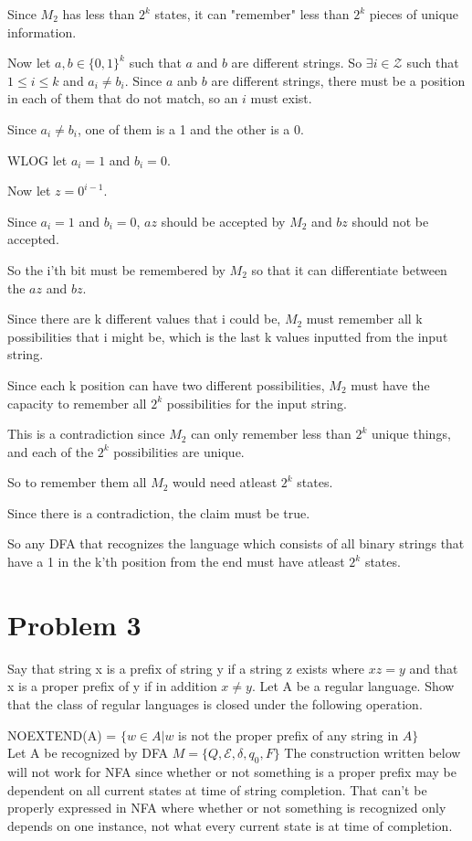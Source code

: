\documentclass[letterpaper, 11pt]{article}
\begin{document}
Since $M_2$ has less than $2^k$ states, it can "remember" less than $2^k$ pieces of unique information.

Now let $a,b \in \{0, 1\}^k$ such that $a$ and $b$ are different strings.
So $\exists i \in \mathcal{Z}$ such that $1 \leq i \leq k$ and $a_i \neq b_i$.
Since $a$ anb $b$ are different strings, there must be a position in each of them that do not match, so an $i$ must exist.

Since $a_i \neq b_i$, one of them is a 1 and the other is a 0.

WLOG let $a_i = 1$ and $b_i = 0$.

Now let $z = 0^{i-1}$.

Since $a_i = 1$ and $b_i = 0$, $az$ should be accepted by $M_2$ and $bz$ should not be accepted.

So the i'th bit must be remembered by $M_2$ so that it can differentiate between the $az$ and $bz$.

Since there are k different values that i could be, $M_2$ must remember all k possibilities that i might be, which is the last k values inputted from the input string.

Since each k position can have two different possibilities, $M_2$ must have the capacity to remember all $2^k$ possibilities for the input string.

This is a contradiction since $M_2$ can only remember less than $2^k$ unique things, and each of the $2^k$ possibilities are unique.

So to remember them all $M_2$ would need atleast $2^k$ states.

Since there is a contradiction, the claim must be true.

So any DFA that recognizes the language which consists of all binary strings that have a 1 in the k’th position from the end must have atleast $2^k$ states.
\newpage
\section{Problem 3}
Say that string x is a prefix of string y if a string z exists where $xz = y$ and that x is a
proper prefix of y if in addition $x \neq y$. Let A be a regular language. Show that the class of regular
languages is closed under the following operation.

NOEXTEND(A) = $\{w \in A|w$ is not the proper prefix of any string in $A\}$\\

Let A be recognized by DFA $M = \{Q, \mathcal{E}, \delta, q_0, F\}$
The construction written below will not work for NFA since whether or not something is a proper prefix may be dependent on all current states at time of string completion.
That can't be properly expressed in NFA where whether or not something is recognized only depends on one instance, not what every current state is at time of completion.
\end{document}
